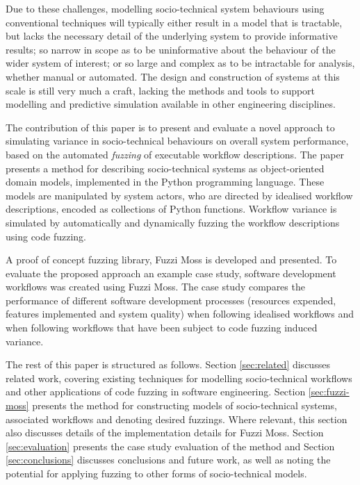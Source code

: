 \documentclass{sig-alternate}
\begin{document}
Due to these challenges, modelling socio-technical system behaviours using
conventional techniques will typically either result in a model that is
tractable, but lacks the necessary detail of the underlying system to provide
informative results; so narrow in scope as to be uninformative about the
behaviour of the wider system of interest; or so large and complex as to be
intractable for analysis, whether manual or automated.  The design and
construction of systems at this scale is still very much a craft, lacking the
methods and tools to support modelling and predictive simulation available in
other engineering disciplines.

The contribution of this paper is to present and evaluate a novel approach to
simulating variance in socio-technical behaviours on overall system performance,
based on the automated \emph{fuzzing} of executable workflow descriptions.  The
paper presents a method for describing socio-technical systems as
object-oriented domain models, implemented in the Python programming language.
These models are manipulated by system actors, who are directed by idealised
workflow descriptions, encoded as collections of Python functions.  Workflow
variance is simulated by automatically and dynamically fuzzing the workflow
descriptions using code fuzzing.

A proof of concept fuzzing library, Fuzzi Moss is developed and presented.  To
evaluate the proposed approach an example case study, software development
workflows was created using Fuzzi Moss.  The case study compares the
performance of different software development processes (resources
expended, features implemented and system quality) when following idealised
workflows and when following workflows that have been subject to code fuzzing
induced variance.

The rest of this paper is structured as follows.  Section \ref{sec:related}
discusses related work, covering existing techniques for modelling
socio-technical workflows and other applications of code fuzzing in software
engineering.  Section \ref{sec:fuzzi-moss} presents the method for constructing
models of socio-technical systems, associated workflows and denoting desired
fuzzings.  Where relevant, this section also discusses details of the
implementation details for Fuzzi Moss.  Section \ref{sec:evaluation} presents
the case study evaluation of the method and Section \ref{sec:conclusions}
discusses conclusions and future work, as well as noting the potential for
applying fuzzing to other forms of socio-technical models.
\end{document}
